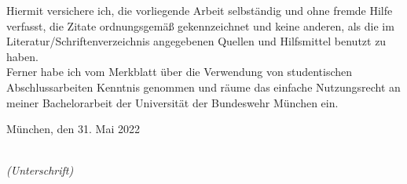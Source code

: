 \newpage

\thispagestyle{empty}

\begin{large}

\vspace*{2cm}

\noindent
Hiermit versichere ich, die vorliegende Arbeit selbständig und ohne fremde Hilfe verfasst,
die Zitate ordnungsgemäß gekennzeichnet und keine anderen,
als die im Literatur/Schriftenverzeichnis angegebenen Quellen und Hilfsmittel benutzt zu haben.\\[1em]

\noindent
Ferner habe ich vom Merkblatt über die Verwendung von studentischen Abschlussarbeiten Kenntnis genommen
und räume das einfache Nutzungsrecht an meiner Bachelorarbeit der Universität der Bundeswehr München ein.

\vspace{2cm}

\noindent
München, den 31. Mai 2022

\vspace{3cm}

\hspace*{7cm}
\dotfill\\
\hspace*{10cm}
\textit{(Unterschrift)}

\end{large}
